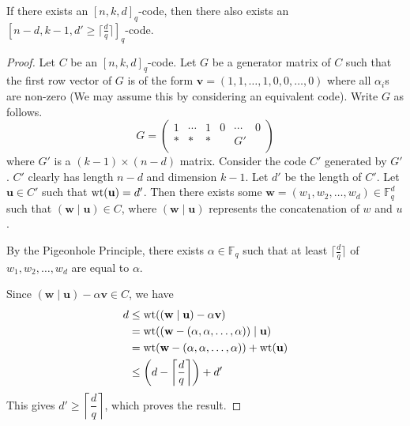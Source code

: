 \begin{lemma}
\label{griesmerPrelim}
    If there exists an $[n,k,d]_q$-code, then there also exists an $[n-d,k-1,d'\geq\lceil\frac{d}{q}\rceil]_q$-code.
\end{lemma}
\begin{proof}
    Let $C$ be an $[n,k,d]_q$-code. Let $G$ be a generator matrix of $C$ such that the first row vector of $G$ is of the form $\textbf{v}=(1,1,\ldots,1,0,0,\ldots,0)$ where all $\alpha_i$s are non-zero (We may assume this by considering an equivalent code). Write $G$ as follows.
    $$G=
    \begin{pmatrix}
    1 & \cdots & 1 & 0 & \cdots & 0 \\
    * & * & * & & G' & \\
    \end{pmatrix}
    $$
    where $G'$ is a $(k-1)\times (n-d)$ matrix. Consider the code $C'$ generated by $G'$. $C'$ clearly has length $n-d$ and dimension $k-1$. Let $d'$ be the length of $C'$. Let $\textbf{u}\in C'$ such that $\operatorname{wt}(\textbf{u})=d'$. Then there exists some $\textbf{w}=(w_1,w_2,\ldots,w_d)\in\mathbb{F}_q^d$ such that $(\textbf{w}\mid \textbf{u})\in C$, where $(\textbf{w}\mid \textbf{u})$ represents the concatenation of $w$ and $u$.
    
    By the Pigeonhole Principle, there exists $\alpha\in\mathbb{F}_q$ such that at least $\lceil\frac{d}{q}\rceil$ of $w_1,w_2,\ldots,w_d$ are equal to $\alpha$.
    
    Since $(\textbf{w}\mid \textbf{u})-\alpha \textbf{v}\in C$, we have
    \begin{align*}
        d &\leq \operatorname{wt}((\textbf{w}\mid \textbf{u})-\alpha \textbf{v}) \\
          &= \operatorname{wt}((\textbf{w} - (\alpha,\alpha,\ldots,\alpha))\mid \textbf{u}) \\
          &= \operatorname{wt}(\textbf{w}- (\alpha,\alpha,\ldots,\alpha)) + \operatorname{wt}(\textbf{u}) \\
          &\leq \left(d-\left\lceil\frac{d}{q}\right\rceil\right)+d'
    \end{align*}
    This gives $d'\geq \left\lceil\dfrac{d}{q}\right\rceil$, which proves the result.
\end{proof}

